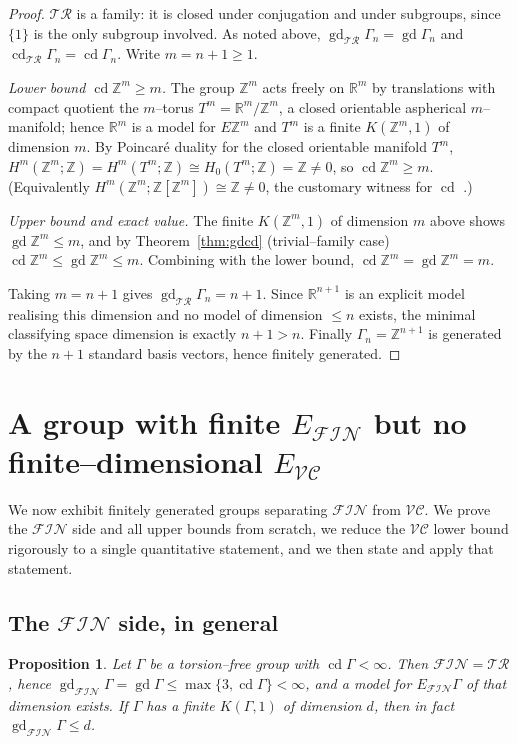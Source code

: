 \documentclass{amsart}
\newtheorem{proposition}{Proposition}
\theoremstyle{definition}
\newcommand{\Z}{\mathbb{Z}}
\newcommand{\R}{\mathbb{R}}
\newcommand{\FIN}{\mathcal{F\!I\!N}}
\newcommand{\VC}{\mathcal{V\!C}}
\newcommand{\gd}{\operatorname{gd}}
\newcommand{\cd}{\operatorname{cd}}
\begin{document}
\begin{proof}
$\mathcal{TR}$ is a family: it is closed under conjugation and under subgroups, since
$\{1\}$ is the only subgroup involved. As noted above,
$\gd_{\mathcal{TR}}\Gamma_n=\gd\Gamma_n$ and $\cd_{\mathcal{TR}}\Gamma_n=\cd\Gamma_n$. Write
$m=n+1\ge 1$.

\smallskip
\emph{Lower bound $\cd\Z^{m}\ge m$.} The group $\Z^{m}$ acts freely on $\R^{m}$ by
translations with compact quotient the $m$--torus $T^{m}=\R^{m}/\Z^{m}$, a closed orientable
aspherical $m$--manifold; hence $\R^{m}$ is a model for $E\Z^{m}$ and $T^{m}$ is a finite
$K(\Z^{m},1)$ of dimension $m$. By Poincaré duality for the closed orientable manifold
$T^{m}$, $H^{m}(\Z^{m};\Z)=H^{m}(T^{m};\Z)\cong H_{0}(T^{m};\Z)=\Z\ne 0$, so
$\cd\Z^{m}\ge m$. (Equivalently $H^{m}(\Z^{m};\Z[\Z^{m}])\cong\Z\ne0$, the customary
witness for $\cd$ \cite[\S VIII.2]{Brown}.)

\smallskip
\emph{Upper bound and exact value.} The finite $K(\Z^{m},1)$ of dimension $m$ above shows
$\gd\Z^{m}\le m$, and by Theorem~\ref{thm:gdcd} (trivial--family case)
$\cd\Z^{m}\le\gd\Z^{m}\le m$. Combining with the lower bound, $\cd\Z^{m}=\gd\Z^{m}=m$.

\smallskip
Taking $m=n+1$ gives $\gd_{\mathcal{TR}}\Gamma_n=n+1$. Since $\R^{n+1}$ is an explicit model
realising this dimension and no model of dimension $\le n$ exists, the minimal classifying
space dimension is exactly $n+1>n$. Finally $\Gamma_n=\Z^{n+1}$ is generated by the $n+1$
standard basis vectors, hence finitely generated.
\end{proof}

\section{A group with finite \texorpdfstring{$E_{\FIN}$}{E\_FIN} but no finite--dimensional
\texorpdfstring{$E_{\VC}$}{E\_VC}}

We now exhibit finitely generated groups separating $\FIN$ from $\VC$. We prove the $\FIN$
side and all upper bounds from scratch, we reduce the $\VC$ lower bound rigorously to a single
quantitative statement, and we then state and apply that statement.

\subsection{The $\FIN$ side, in general}

\begin{proposition}\label{prop:finside}
Let $\Gamma$ be a torsion--free group with $\cd\Gamma<\infty$. Then $\FIN=\mathcal{TR}$, hence
$\gd_{\FIN}\Gamma=\gd\Gamma\le\max\{3,\cd\Gamma\}<\infty$, and a model for $E_{\FIN}\Gamma$ of
that dimension exists. If $\Gamma$ has a finite $K(\Gamma,1)$ of dimension $d$, then in fact
$\gd_{\FIN}\Gamma\le d$.
\end{proposition}
\end{document}
